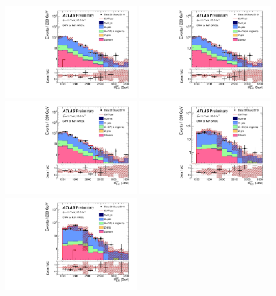 \begin{figure}[tbp]
\begin{center}
\includegraphics[width=0.45\textwidth]{figures/ATLAS-CONF-2016-078_INT/N-1Plots/AtlasStyle/Preliminary/CRW_SRJigsawSRG1a_LastCut_CRW_minusone}
\includegraphics[width=0.45\textwidth]{figures/ATLAS-CONF-2016-078_INT/N-1Plots/AtlasStyle/Preliminary/CRW_SRJigsawSRG2a_LastCut_CRW_minusone}
\includegraphics[width=0.45\textwidth]{figures/ATLAS-CONF-2016-078_INT/N-1Plots/AtlasStyle/Preliminary/CRW_SRJigsawSRG3a_LastCut_CRW_minusone}
\includegraphics[width=0.45\textwidth]{figures/ATLAS-CONF-2016-078_INT/N-1Plots/AtlasStyle/Preliminary/CRW_SRJigsawSRS1a_LastCut_CRW_minusone}
\includegraphics[width=0.45\textwidth]{figures/ATLAS-CONF-2016-078_INT/N-1Plots/AtlasStyle/Preliminary/CRW_SRJigsawSRS2a_LastCut_CRW_minusone}

\end{center}
\end{figure}
